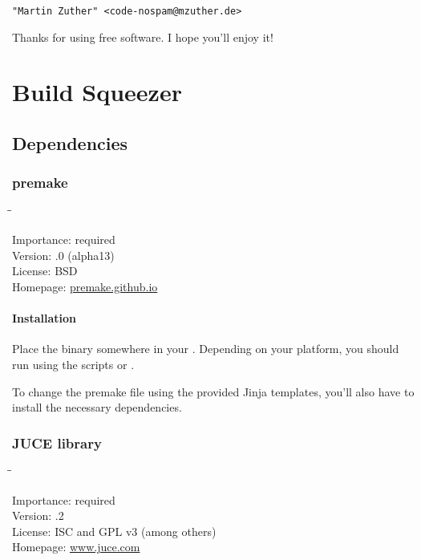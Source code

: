 \begin{center}
  \texttt{"Martin Zuther" <code-nospam@mzuther.de>}
\end{center}

Thanks for using free software.  I hope you'll enjoy it!

\appendix

\chapter{Build Squeezer}
\label{chap:build_squeezer}

\section{Dependencies}
\label{sec:dependencies}

\subsection{premake}
\label{sec:dependencies_premake}

\begin{tabbing}
  \hspace*{6em}\=\=\kill

  Importance:  \> required \\
  Version:     .0 (alpha13) \\
  License:     \> BSD \\
  Homepage:    \> \href{https://premake.github.io/}{premake.github.io}
\end{tabbing}

\subsubsection{Installation}

Place the binary somewhere in your .  Depending on your
platform, you should run  using the scripts
 or .

To change the premake file using the provided Jinja templates, you'll
also have to install the necessary dependencies.

\subsection{JUCE library}

\begin{tabbing}
  \hspace*{6em}\=\=\kill

  Importance:  \> required \\
  Version:     .2 \\
  License:     \> ISC and GPL v3 (among others) \\
  Homepage:    \> \href{http://www.juce.com/}{www.juce.com}
\end{tabbing}

